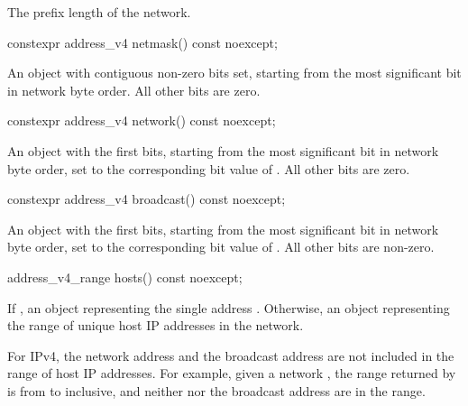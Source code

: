\begin{itemdescr}
\pnum
\returns The prefix length of the network.
\end{itemdescr}

\begin{itemdecl}
constexpr address_v4 netmask() const noexcept;
\end{itemdecl}

\begin{itemdescr}
\pnum
\returns An  object with  contiguous non-zero bits set, starting from the most significant bit in network byte order. All other bits are zero.
\end{itemdescr}

\begin{itemdecl}
constexpr address_v4 network() const noexcept;
\end{itemdecl}

\begin{itemdescr}
\pnum
\returns An  object with the first  bits, starting from the most significant bit in network byte order, set to the corresponding bit value of . All other bits are zero.
\end{itemdescr}

\begin{itemdecl}
constexpr address_v4 broadcast() const noexcept;
\end{itemdecl}

\begin{itemdescr}
\pnum
\returns An  object with the first  bits, starting from the most significant bit in network byte order, set to the corresponding bit value of . All other bits are non-zero.
\end{itemdescr}

\begin{itemdecl}
address_v4_range hosts() const noexcept;
\end{itemdecl}

\begin{itemdescr}
\pnum
\returns If , an  object representing the single address . Otherwise, an  object representing the range of unique host IP addresses in the network.

\pnum
\enternote For IPv4, the network address and the broadcast address are not included in the range of host IP addresses. For example, given a network , the range returned by  is from  to  inclusive, and neither  nor the broadcast address  are in the range. \exitnote
\end{itemdescr}

